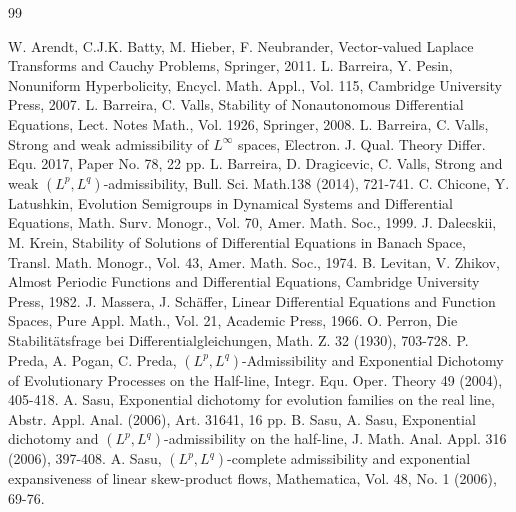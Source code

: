 \documentclass[reqno]{amsart}
\begin{document}
	
\begin{thebibliography}{99}
 W. Arendt, C.J.K. Batty, M. Hieber, F. Neubrander, Vector-valued Laplace Transforms and Cauchy Problems, Springer,
2011.
 L. Barreira, Y. Pesin, Nonuniform Hyperbolicity, Encycl. Math. Appl., Vol. 115, Cambridge University Press, 2007.
 L. Barreira, C. Valls, Stability of Nonautonomous Differential Equations, Lect. Notes Math., Vol. 1926, Springer,
2008.
 L. Barreira, C. Valls, Strong and weak admissibility of $L^\infty$ spaces, Electron. J. Qual. Theory Differ. Equ. 2017, Paper No. 78, 22 pp.
 L. Barreira, D. Dragicevic, C. Valls, Strong and weak $(L^p,L^q )$-admissibility, Bull. Sci. Math.138 (2014), 721-741.
 C. Chicone, Y. Latushkin, Evolution Semigroups in Dynamical Systems and Differential Equations, Math. Surv.
Monogr., Vol. 70, Amer. Math. Soc., 1999.
 J. Dalecskii, M. Krein, Stability of Solutions of Differential Equations in Banach Space, Transl. Math. Monogr.,
Vol. 43, Amer. Math. Soc., 1974.
 B. Levitan, V. Zhikov, Almost Periodic Functions and Differential Equations, Cambridge University Press, 1982.
 J. Massera, J. Schäffer, Linear Differential Equations and Function Spaces, Pure Appl. Math., Vol. 21, Academic
Press, 1966.
 O. Perron, Die Stabilitätsfrage bei Differentialgleichungen, Math. Z. 32 (1930), 703-728.
 P. Preda, A. Pogan, C. Preda, $(L^p,L^q )$-Admissibility and Exponential Dichotomy of Evolutionary Processes on the Half-line, Integr. Equ. Oper. Theory 49 (2004), 405-418.
 A. Sasu, Exponential dichotomy for evolution families on the real line, Abstr. Appl. Anal. (2006), Art. 31641, 16 pp.
 B. Sasu, A. Sasu, Exponential dichotomy and $(L^p,L^q )$-admissibility on the half-line, J. Math. Anal. Appl. 316 (2006), 397-408.
 A. Sasu, $(L^p,L^q )$-complete admissibility and exponential expansiveness of linear skew-product flows, Mathematica, Vol. 48, No. 1 (2006), 69-76.

\end{thebibliography}








\end{document}

